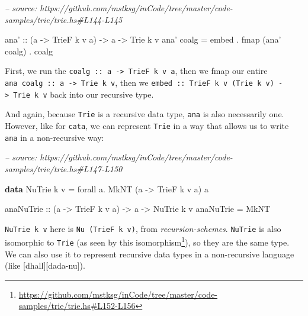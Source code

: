 \documentclass[]{article}
\newenvironment{Shaded}{}{}
\newcommand{\CommentTok}[1]{\textcolor[rgb]{0.38,0.63,0.69}{\textit{#1}}}
\newcommand{\DataTypeTok}[1]{\textcolor[rgb]{0.56,0.13,0.00}{#1}}
\newcommand{\FunctionTok}[1]{\textcolor[rgb]{0.02,0.16,0.49}{#1}}
\newcommand{\KeywordTok}[1]{\textcolor[rgb]{0.00,0.44,0.13}{\textbf{#1}}}
\newcommand{\NormalTok}[1]{#1}
\newcommand{\OtherTok}[1]{\textcolor[rgb]{0.00,0.44,0.13}{#1}}
\renewcommand{\href}[2]{#2\footnote{\url{#1}}}
\begin{document}
\begin{Shaded}
\begin{Highlighting}[]
\CommentTok{-- source: https://github.com/mstksg/inCode/tree/master/code-samples/trie/trie.hs#L144-L145}

\OtherTok{ana' ::}\NormalTok{ (a }\OtherTok{->} \DataTypeTok{TrieF}\NormalTok{ k v a) }\OtherTok{->}\NormalTok{ a }\OtherTok{->} \DataTypeTok{Trie}\NormalTok{ k v}
\NormalTok{ana' coalg }\FunctionTok{=}\NormalTok{ embed }\FunctionTok{.}\NormalTok{ fmap (ana' coalg) }\FunctionTok{.}\NormalTok{ coalg}
\end{Highlighting}
\end{Shaded}

First, we run the \texttt{coalg\ ::\ a\ -\textgreater{}\ TrieF\ k\ v\ a}, then
we fmap our entire \texttt{ana\ coalg\ ::\ a\ -\textgreater{}\ Trie\ k\ v}, then
we \texttt{embed\ ::\ TrieF\ k\ v\ (Trie\ k\ v)\ -\textgreater{}\ Trie\ k\ v}
back into our recursive type.

And again, because \texttt{Trie} is a recursive data type, \texttt{ana} is also
necessarily one. However, like for \texttt{cata}, we can represent \texttt{Trie}
in a way that allows us to write \texttt{ana} in a non-recursive way:

\begin{Shaded}
\begin{Highlighting}[]
\CommentTok{-- source: https://github.com/mstksg/inCode/tree/master/code-samples/trie/trie.hs#L147-L150}

\KeywordTok{data} \DataTypeTok{NuTrie}\NormalTok{ k v }\FunctionTok{=}\NormalTok{ forall a}\FunctionTok{.} \DataTypeTok{MkNT}\NormalTok{ (a }\OtherTok{->} \DataTypeTok{TrieF}\NormalTok{ k v a) a}

\OtherTok{anaNuTrie ::}\NormalTok{ (a }\OtherTok{->} \DataTypeTok{TrieF}\NormalTok{ k v a) }\OtherTok{->}\NormalTok{ a }\OtherTok{->} \DataTypeTok{NuTrie}\NormalTok{ k v }
\NormalTok{anaNuTrie }\FunctionTok{=} \DataTypeTok{MkNT}
\end{Highlighting}
\end{Shaded}

\texttt{NuTrie\ k\ v} here is \texttt{Nu\ (TrieF\ k\ v)}, from
\emph{recursion-schemes}. \texttt{NuTrie} is also isomorphic to \texttt{Trie}
(as seen by
\href{https://github.com/mstksg/inCode/tree/master/code-samples/trie/trie.hs\#L152-L156}{this
isomorphism}), so they are the same type. We can also use it to represent
recursive data types in a non-recursive language (like
{[}dhall{]}{[}dada-nu{]}).
\end{document}
